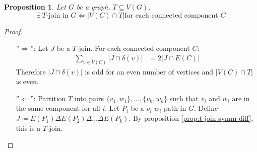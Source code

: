 \documentclass[11pt, a4paper]{article}
\newcommand{\abs}[1]{\left\lvert#1\right\rvert}
\newcommand{\set}[1]{\{#1\}}
\newtheorem{prop}[theorem]{Proposition}
\theoremstyle{remark}
\theoremstyle{definition}
\begin{document}
\begin{prop}\label{prop:t-join-parity}
	Let $G$ be a graph, $T\subseteq V(G)$.
	\[\exists\ T\text{-join in }G \Leftrightarrow \abs{V(C)\cap T}\text{for each
			connected component }C\]
\end{prop}
\begin{proof}\
	\begin{enumerate}
		\item[''$\Rightarrow$'':]
		Let $J$ be a $T$-join. For each connected component $C$:
		\begin{align*}
			\sum_{v\in V(C)}\abs{J\cap \delta(v)} & =2\abs{J\cap E(C)}
		\end{align*}
		Therefore $\abs{J\cap\delta(v)}$ is odd for an even number of vertices and
		$\abs{V(C)\cap T}$ is even.

		\item[''$\Leftarrow$'':]
		Partition $T$ into pairs $\set{v_1,w_1},\ldots,\set{v_k,w_k}$ such that
		$v_i$ and $w_i$ are in the same component for all $i$. Let $P_i$ be a
		$v_i$-$w_i$-path in $G$. Define $J\coloneqq E(P_1)\Delta E(P_2)\Delta\ldots
			\Delta E(P_k)$. By proposition \ref{prop:t-join-symm-diff}, this is a
		$T$-join.
	\end{enumerate}
\end{proof}
\end{document}
